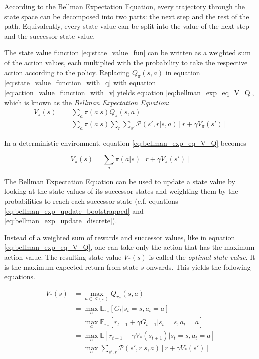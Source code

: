 According to the Bellman Expectation Equation, every trajectory through the state space can be decomposed into two parts: the next step and the rest of the path. Equivalently, every state value can be split into the value of the next step and the successor state value.

The state value function \ref{eq:state_value_fun} can be written as a weighted sum of the action values, each multiplied with the probability to take the respective action according to the policy. Replacing $Q_\pi(s,a)$ in equation \ref{eq:state_value_function_with_q} with equation \ref{eq:action_value_function_with_v} yields equation \ref{eq:bellman_exp_eq_V_Q}, which is known as the \textit{Bellman Expectation Equation}:
\begin{align}
V_\pi(s)&=\sum_a \pi(a|s)Q_\pi(s,a)\\ &= \sum_a \pi(a|s)\sum_r \sum_{s'} \mathcal{P}(s',r|s,a)[r+\gamma V_{\pi}(s')]
\label{eq:bellman_exp_eq_V_Q}
\end{align}

In a deterministic environment, equation \ref{eq:bellman_exp_eq_V_Q} becomes

\begin{equation}
V_\pi(s)= \sum_a \pi(a|s)[r+\gamma V_{\pi}(s')]
\label{eq:bellman_exp_eq_V_determinisic}
\end{equation}

The Bellman Expectation Equation can be used to update a state value by looking at the state values of its successor states and weighting them by the probabilities to reach each successor state (c.f. equations \ref{eq:bellman_exp_update_bootstrapped} and \ref{eq:bellman_exp_update_discrete}).

Instead of a weighted sum of rewards and successor values, like in equation \ref{eq:bellman_exp_eq_V_Q}, one can take only the action that has the maximum action value. The resulting state value $V_*(s)$ is called the \textit{optimal state value}. It is the maximum expected return from state $s$ onwards. This yields the following equations. 

\begin{align}
V_*(s)&=\max_{a \in \mathcal{A}(s)} Q_{\pi_*}(s,a) \label{eq:bellman_optimality_equation_v_with_q}\\
&=\max_{a}\mathbb{E}_{\pi_*}[G_t|s_t=s,a_t=a]\\
&=\max_{a}\mathbb{E}_{\pi_*}[r_{t+1} + \gamma G_{t+1}|s_t=s,a_t=a]\\
&=\max_{a}\mathbb{E}[r_{t+1} + \gamma V_*(s_{t+1})|s_t=s,a_t=a]\\
&=\max_{a}\sum_{s',r}\mathcal{P}(s',r|s,a)[r + \gamma V_*(s')]
\label{eq:bellman_optimality_equation_stochastic}
\end{align}

